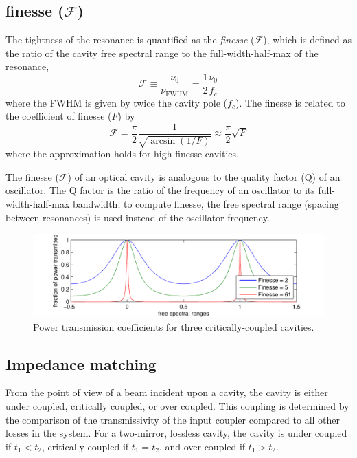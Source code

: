 \subsection{finesse ($\mathcal{F}$)}
\label{sec:finesse}
The tightness of the resonance is quantified as the
\emph{finesse} ($\mathcal{F}$), which is defined as the ratio of the
cavity free spectral range to the full-width-half-max of the
resonance,
\begin{equation}
\mathcal{F} \equiv \frac{\nu_0}{\nu_{\mathrm{FWHM}}}
= \frac{1}{2}\frac{\nu_0}{f_c}
\end{equation}
%
where the FWHM is given by twice the cavity pole ($f_c$).  The finesse is related to the coefficient of finesse ($F$) by
%
\begin{equation}
\mathcal{F} = \frac{\pi}{2} \frac{1}{{\sqrt{\arcsin (1/F)}}} \approx \frac{\pi}{2}\sqrt{F}
\end{equation}where the approximation holds for high-finesse cavities.

The finesse ($\mathcal{F}$) of an optical cavity is analogous to
the quality factor (Q) of an oscillator. The Q factor is the ratio
of the frequency of an oscillator to its full-width-half-max bandwidth;
to compute finesse, the free spectral range (spacing between resonances)
is used instead of the oscillator frequency.

\begin{figure}
\begin{centering}
\includegraphics{figures/finesses}
\end{centering}
\caption[Cavity buildup versus detuning]{Power transmission coefficients for three critically-coupled cavities.}
\end{figure}

\subsection{Impedance matching}

From the point of view of a beam incident upon a cavity, the cavity is
either under coupled, critically coupled, or over coupled. This
coupling is determined by the comparison of the transmissivity of the
input coupler compared to all other losses in the system. For a
two-mirror, lossless cavity, the cavity is under coupled if $t_1 <
t_2$, critically coupled if $t_1 = t_2$, and over coupled if $t_1 >
t_2$.


